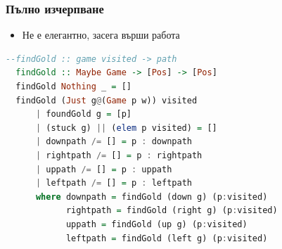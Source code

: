 \documentclass{beamer}
\begin{document}
\begin{frame}[fragile]
  \frametitle{Пълно изчерпване}


     
\begin{itemize}
  \item Не е елегантно, засега върши работа
\end{itemize}

\begin{lstlisting}[basicstyle=\small,language=Haskell]
  --findGold :: game visited -> path
  findGold :: Maybe Game -> [Pos] -> [Pos]
  findGold Nothing _ = []
  findGold (Just g@(Game p w)) visited
      | foundGold g = [p]
      | (stuck g) || (elem p visited) = []
      | downpath /= [] = p : downpath
      | rightpath /= [] = p : rightpath
      | uppath /= [] = p : uppath
      | leftpath /= [] = p : leftpath
      where downpath = findGold (down g) (p:visited)
            rightpath = findGold (right g) (p:visited)
            uppath = findGold (up g) (p:visited)
            leftpath = findGold (left g) (p:visited)  
\end{lstlisting}
  

\end{frame}


\end{document}
